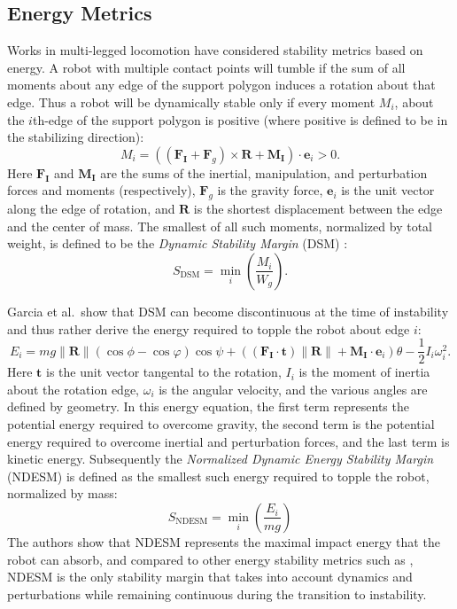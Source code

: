 \documentclass[12pt,a4paper,twoside]{article}
\newcommand{\vvc}[1]{{\bm{#1}}}
\begin{document}
\subsection{Energy Metrics}
Works in multi-legged locomotion have considered stability metrics based on energy. A robot with multiple contact points will tumble if the sum of all moments about any edge of the support polygon induces a rotation about that edge. Thus a robot will be dynamically stable only if every moment $M_i$, about the $i$th-edge of the support polygon is positive (where positive is defined to be in the stabilizing direction): 
\begin{equation}
M_i = \left((\vvc{F}_\vvc{I}+\vvc{F}_{g}) \times \vvc{R} + \vvc{M}_\vvc{I} \right) \cdot \vvc{e}_i > 0.
\end{equation}
Here $\vvc{F}_\vvc{I}$ and $ \vvc{M}_\vvc{I}$ are the sums of the inertial, manipulation, and perturbation forces and moments (respectively), $\vvc{F}_{g}$ is the gravity force, $\vvc{e}_i$ is the unit vector along the edge of rotation, and $\vvc{R}$ is the shortest displacement between the edge and the center of mass. The smallest of all such moments, normalized by total weight, is defined to be the \emph{Dynamic Stability Margin} (DSM) \cite{Lin2001}:
\begin{equation}
S_\text{DSM} = \min_i\left(\frac{ M_i}{ W_g} \right).
\end{equation}

Garcia et al.\ show that DSM can become discontinuous at the time of instability \cite{Garcia2005} and thus rather derive the energy required to topple the robot about edge $i$:
\begin{equation}
E_i = mg\|\vvc{R}\|(\cos \phi - \cos \varphi)\cos \psi + \left((\vvc{F}_\vvc{I} \cdot \vvc{t}) \|\vvc{R}\|+\vvc{M}_\vvc{I}\cdot\vvc{e}_i\right)\theta - \frac{1}{2}I_i\omega^2_i.
\end{equation}
Here $\vvc{t}$ is the unit vector tangental to the rotation, $I_i$ is the moment of inertia about the rotation edge, $\omega_i$ is the angular velocity, and the various angles are defined by geometry. In this energy equation, the first term represents the potential energy required to overcome gravity, the second term is the potential energy required to overcome inertial and perturbation forces, and the last term is kinetic energy. Subsequently the \emph{Normalized Dynamic Energy Stability Margin} (NDESM) \cite{Garcia2006} is defined as the smallest such energy required to topple the robot, normalized by mass:
\begin{equation}
S_\text{NDESM} = \min_i \left( \frac{E_i}{mg} \right)
\end{equation}
The authors show that NDESM represents the maximal impact energy that the robot can absorb, and compared to other energy stability metrics such as \cite{Messuri1985,Papadopoulos1996, Hirose2001}, NDESM is the only stability margin that takes into account dynamics and perturbations while remaining continuous during the transition to instability.  





\end{document}
